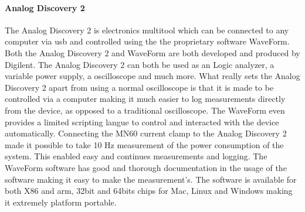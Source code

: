 \paragraph*{Analog Discovery 2}
The Analog Discovery 2 is electronics multitool which can be connected to any computer via usb and controlled using the the proprietary software WaveForm. Both the Analog Discovery 2 and WaveForm are both developed and produced by Digilent. The Analog Discovery 2 can both be used as an Logic analyzer, a variable power supply, a oscilloscope and much more\cite{AnalogDoc}. What really sets the Analog Discovery 2 apart from using a normal oscilloscope is that it is made to be controlled via a computer making it much easier to log measurements directly from the device, as opposed to a traditional oscilloscope. The WaveForm even provides a limited scripting langue to control and interacted with the device automatically. Connecting the MN60 current clamp to the Analog Discovery 2 made it possible to take 10 Hz measurement of the power consumption of the system. This enabled easy and continues measurements and logging. The WaveForm software has good and thorough documentation in the usage of the software making it easy to make the measurement's. The software is available for both X86 and arm, 32bit and 64bits chips for Mac, Linux and Windows making it extremely platform portable.